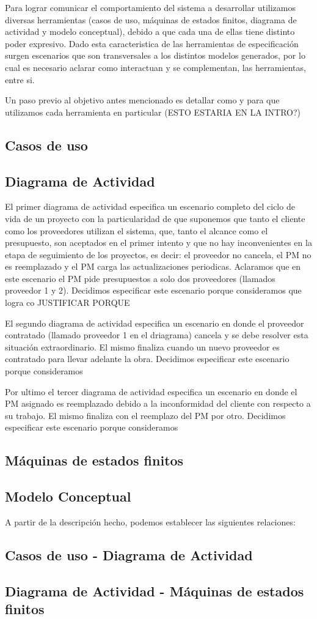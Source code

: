 Para lograr comunicar el comportamiento del sistema a desarrollar utilizamos diversas herramientas (casos de uso, máquinas de estados finitos, diagrama de actividad y modelo conceptual), debido a que cada una de ellas tiene distinto poder expresivo.
Dado esta caracteristica de las herramientas de especificación surgen escenarios que son transversales a los distintos modelos generados, por lo cual es necesario aclarar como interactuan y se complementan, las herramientas, entre si.

Un paso previo al objetivo antes mencionado es detallar como y para que utilizamos cada herramienta en particular (ESTO ESTARIA EN LA INTRO?)
\subsection{Casos de uso}

\subsection{Diagrama de Actividad}
El primer diagrama de actividad especifica un escenario completo del ciclo de vida de un proyecto con la particularidad de que suponemos que tanto el cliente como los proveedores utilizan el sistema, que, tanto el alcance como el presupuesto, son aceptados en el primer intento y que no hay inconvenientes en la etapa de seguimiento de los proyectos, es decir: el proveedor no cancela, el PM no es reemplazado y el PM carga las actualizaciones periodicas. Aclaramos que en este escenario el PM pide presupuestos a solo dos proveedores (llamados proveedor 1 y 2). Decidimos especificar este escenario porque consideramos que logra co
JUSTIFICAR PORQUE

El segundo diagrama de actividad especifica un escenario en donde el proveedor contratado (llamado proveedor 1 en el driagrama) cancela y se debe resolver esta situación extraordinario. El mismo finaliza cuando un nuevo proveedor es contratado para llevar adelante la obra. Decidimos especificar este escenario porque consideramos

Por ultimo el tercer diagrama de actividad especifica un escenario en donde el PM asignado es reemplazado debido a la inconformidad del cliente con respecto a su trabajo. El mismo finaliza con el reemplazo del PM por otro. Decidimos especificar este escenario porque consideramos

\subsection{Máquinas de estados finitos}

\subsection{Modelo Conceptual}

A partir de la descripción hecho, podemos establecer las siguientes relaciones:
\subsection{Casos de uso - Diagrama de Actividad}

\subsection{Diagrama de Actividad - Máquinas de estados finitos}
